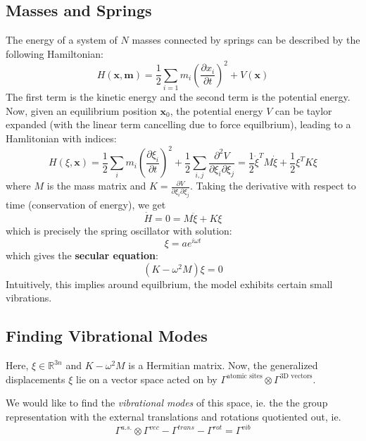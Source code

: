 \documentclass[9pt]{article}
\begin{document}
\begin{multicols}{2}
\subsection{Masses and Springs}

The energy of a system of $N$ masses connected by springs can be
described by the following Hamiltonian:
\begin{equation}
    H(\mathbf{x},\mathbf{m}) = \frac{1}{2}\sum\limits_{i=1} m_i
    \left(\frac{\partial x_i}{\partial t}\right)^2 + V(\mathbf{x})
\end{equation}
The first term is the kinetic energy and the second term is the 
potential energy. Now, given an equilibrium position $\mathbf{x}_0$,
the potential energy $V$ can be taylor expanded (with the linear 
term cancelling due to force equilbrium), leading to a Hamlitonian
with indices:
\begin{equation}
    H(\xi, \mathbf{x}) = \frac{1}{2}\sum_{i}m_i\left(
    \frac{\partial \xi_i}{\partial t}\right)^2 + \frac{1}{2}
    \sum_{i,j}\frac{\partial^2V}{\partial\xi_i\partial\xi_j}
    = \frac{1}{2}\dot\xi^{T}M\dot\xi + \frac{1}{2}\xi^{T}K\xi
\end{equation}
where $M$ is the mass matrix and $K=\frac{\partial V}{\partial\xi_i
\partial\xi_j}$. Taking the derivative with respect to time
(conservation of energy), we get
\begin{equation}
    \dot H = 0 = M\ddot \xi + K \xi
\end{equation}
which is precisely the spring oscillator with solution:
\begin{equation}
    \xi = ae^{i\omega t} 
\end{equation}
which gives the \textbf{secular equation}:
\begin{equation}
    (K - \omega^2M)\xi = 0
\end{equation}
Intuitively, this implies around equilbrium, the model exhibits 
certain small vibrations.

\subsection{Finding Vibrational Modes}

Here, $\xi \in \mathbb{R}^{3n}$ and $K-\omega^2M$ is a Hermitian
matrix. Now, the generalized displacements $\xi$ lie on a vector
space acted on by $\Gamma^{\text{atomic sites}} \otimes \Gamma^{
\text{3D vectors}}$. 

We would like to find the \textit{vibrational modes} of this
space, ie. the the group representation with the external
translations and rotations quotiented out, ie. 
\begin{equation}
    \Gamma^{a.s.} \otimes \Gamma^{vec} - \Gamma^{trans} - \Gamma^{rot} = \Gamma^{vib}
\end{equation}


\end{multicols}
\end{document}
